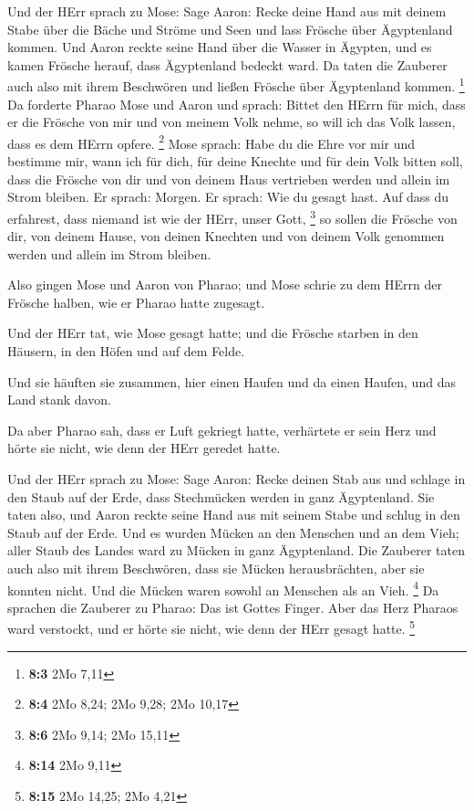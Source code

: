  Und der HErr sprach zu Mose: Sage Aaron: Recke deine Hand
aus mit deinem Stabe über die Bäche und Ströme und Seen und lass Frösche
über Ägyptenland kommen.  Und Aaron reckte seine Hand über
die Wasser in Ägypten, und es kamen Frösche herauf, dass Ägyptenland
bedeckt ward.  Da taten die Zauberer auch also mit ihrem
Beschwören und ließen Frösche über Ägyptenland kommen. \footnote{\textbf{8:3}
  2Mo 7,11}  Da forderte Pharao Mose und Aaron und sprach:
Bittet den HErrn für mich, dass er die Frösche von mir und von meinem
Volk nehme, so will ich das Volk lassen, dass es dem HErrn opfere.
\footnote{\textbf{8:4} 2Mo 8,24; 2Mo 9,28; 2Mo 10,17} 
Mose sprach: Habe du die Ehre vor mir und bestimme mir, wann ich für
dich, für deine Knechte und für dein Volk bitten soll, dass die Frösche
von dir und von deinem Haus vertrieben werden und allein im Strom
bleiben.  Er sprach: Morgen. Er sprach: Wie du gesagt
hast. Auf dass du erfahrest, dass niemand ist wie der HErr, unser Gott,
\footnote{\textbf{8:6} 2Mo 9,14; 2Mo 15,11}  so sollen die
Frösche von dir, von deinem Hause, von deinen Knechten und von deinem
Volk genommen werden und allein im Strom bleiben.

 Also gingen Mose und Aaron von Pharao; und Mose schrie zu
dem HErrn der Frösche halben, wie er Pharao hatte zugesagt.

 Und der HErr tat, wie Mose gesagt hatte; und die Frösche
starben in den Häusern, in den Höfen und auf dem Felde.

 Und sie häuften sie zusammen, hier einen Haufen und da
einen Haufen, und das Land stank davon.

 Da aber Pharao sah, dass er Luft gekriegt hatte,
verhärtete er sein Herz und hörte sie nicht, wie denn der HErr geredet
hatte.

 Und der HErr sprach zu Mose: Sage Aaron: Recke deinen
Stab aus und schlage in den Staub auf der Erde, dass Stechmücken werden
in ganz Ägyptenland.  Sie taten also, und Aaron reckte
seine Hand aus mit seinem Stabe und schlug in den Staub auf der Erde.
Und es wurden Mücken an den Menschen und an dem Vieh; aller Staub des
Landes ward zu Mücken in ganz Ägyptenland.  Die Zauberer
taten auch also mit ihrem Beschwören, dass sie Mücken herausbrächten,
aber sie konnten nicht. Und die Mücken waren sowohl an Menschen als an
Vieh. \footnote{\textbf{8:14} 2Mo 9,11}  Da sprachen die
Zauberer zu Pharao: Das ist Gottes Finger. Aber das Herz Pharaos ward
verstockt, und er hörte sie nicht, wie denn der HErr gesagt hatte.
\footnote{\textbf{8:15} 2Mo 14,25; 2Mo 4,21}

